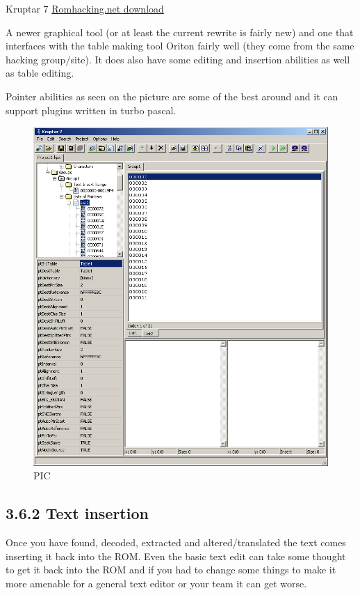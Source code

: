 \documentclass[
]{book}
\begin{document}
Kruptar 7 \href{http://www.romhacking.net/utilities/612/}{Romhacking.net download}

A newer graphical tool (or at least the current rewrite is fairly new) and one that interfaces with the table making tool Oriton fairly well (they come from the same hacking group/site). It does also have some editing and insertion abilities as well as table editing.

Pointer abilities as seen on the picture are some of the best around and it can support plugins written in turbo pascal.

\begin{figure}
\centering
\includegraphics{images/133_home_fast6191_romhackingguide_unrenamed_fil___mhackguidetextextractionkruptar7_1_tofinish.png}
\caption{PIC}
\end{figure}

\hypertarget{text-insertion}{%
\subsection{3.6.2 Text insertion}\label{text-insertion}}

Once you have found, decoded, extracted and altered/translated the text comes inserting it back into the ROM. Even the basic text edit can take some thought to get it back into the ROM and if you had to change some things to make it more amenable for a general text editor or your team it can get worse.
\end{document}
